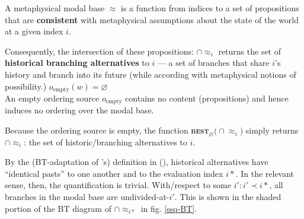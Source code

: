 A metaphysical modal base $ \approx$ is a function from indices to a set of propositions that are \textbf{consistent} with metaphysical assumptions about the state of the world at a given index $ i $.

Consequently, the intersection of these propositions: $ \cap\!\approx_i$ returns the set of \textbf{historical branching alternatives} to $ i $ --- a set of branches that share $ i $'s history and branch into its future (while according with metaphysical notions of possibility.)
\a %
$ o_{\text{empty}}(w)=\varnothing$\\
An empty ordering source $ o_\text{empty}$ contains no content (propositions) and hence induces no ordering over the modal base.





\a Because the ordering source is empty, the function \textbf{\textsc{best}}$_{\varnothing}\big(\cap\!\approx_i\big)$ simply returns $ \cap\!\approx_i $: the set of historic/branching alternatives to $ i $.
\xe

By the (\acrlong{BT}-adaptation of \citeauthor{Thomason1970}'s) definition in (), historical alternatives have ``identical pasts'' to one another and to the evaluation index $ i* $. In the relevant sense, then, the quantification is trivial. With/respect to some $ i':i'\prec i* $, all branches in the modal base are undivided-at-$ i' $. This is shown in the shaded portion of the \acrshort{BT} diagram of $ \cap\!\approx_{i*} $ in fig. \ref{ssq-BT}.


